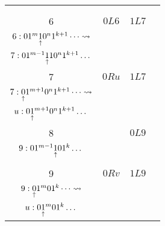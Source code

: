 \begin{pf}
\begin{center}
\begin{tabular}{ |c|c|c|c| }
{            $6: 01^{m+1} 0^{n-2}\pointer{0}0 1^{k+1}\dots$\\
        } 
        \\  \hline
        6 & $0L6$ & $1L7$ & \makecell{
            $6: 01^{m+1} 0^{n-2}\pointer{0}0 1^{k+1}\dots\leadsto$\\ 
            $6: 01^m \underset{\substack{\uparrow}}{1} 0^n 1^{k+1}\dots\leadsto$\\
            $7: 01^{m-1} \underset{\substack{\uparrow}}{1} 1 0^n 1^{k+1}\dots$
        } 
        \\  \hline
        7 & $0Ru$ & $1L7$ & \makecell{
            $7: 01^{m-1} \pointer{1} 1 0^n 1^{k+1}\dots\leadsto$\\ 
            $7: \underset{\substack{\uparrow}}{0}1^{m+1} 0^n 1^{k+1}\dots\leadsto$\\
            $u: 0\underset{\substack{\uparrow}}{1}^{m+1} 0^n 1^{k+1}\dots$
        } 
        \\  \hline
        8 & & $0L9$ & \makecell{
            $8: 01^{m} \pointer{1} 1^k\dots\leadsto$\\ 
            $9: 01^{m-1} \underset{\substack{\uparrow}}{1} 0 1^k\dots$\\
        } 
        \\  \hline
        9 & $0Rv$ & $1L9$ & \makecell{
            $9: 01^{m-1} \pointer{1} 0 1^k\dots\leadsto$\\ 
            $9: \underset{\substack{\uparrow}}{0}1^{m} 0 1^k\dots\leadsto$\\
            $u: 0\underset{\substack{\uparrow}}{1}^{m} 0 1^{k}\dots$
        } 
        \\  \hline
        \end{tabular}
    \end{center}


\end{pf}
